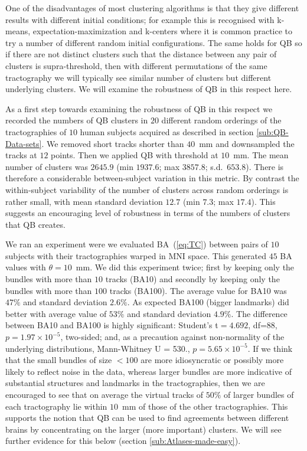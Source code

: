 \documentclass{bioinfo}
\begin{document}
One of the disadvantages of most clustering algorithms is that they give
different results with different initial conditions; for example this is
recognised with k-means, expectation-maximization
\citep{dempster1977maximum} and k-centers \citep{gonzalez1985clustering}
where it is common practice to try a number of different random initial
configurations. The same holds for QB so if there are not distinct
clusters such that the distance between any pair of clusters is
supra-threshold, then with different permutations of the same
tractography we will typically see similar number of clusters but
different underlying clusters. We will examine the robustness of QB in
this respect here.

As a first step towards examining the robustness of QB in this respect
we recorded the numbers of QB clusters in $20$ different random
orderings of the tractographies of $10$ human subjects acquired as
described in section \ref{sub:QB-Data-sets}. We removed short tracks
shorter than $40$~mm and downsampled the tracks at $12$ points. Then we
applied QB with threshold at $10$~mm. The mean number of clusters was
$2645.9$ (min $1937.6$; max $3857.8$; s.d.~$653.8$). There is therefore
a considerable between-subject variation in this metric. By contrast the
within-subject variability of the number of clusters across random
orderings is rather small, with mean standard deviation $12.7$ (min
$7.3$; max $17.4$). This suggests an encouraging level of robustness in
terms of the numbers of clusters that QB creates.

We ran an experiment were we evaluated BA~(\ref{eq:TC}) between pairs of
$10$ subjects with their tractographies warped in MNI space. This
generated $45$ BA values with $\theta=10$~mm. We did
this experiment twice; first by keeping only the bundles with more than
$10$ tracks (BA10) and secondly by keeping only the bundles with more
than $100$ tracks (BA100). The average value for BA10 was $47\%$ and
standard deviation $2.6\%$. As expected BA100 (bigger landmarks) did
better with average value of $53\%$ and standard deviation $4.9\%$. The
difference between BA10 and BA100 is highly significant: Student's
t$=4.692$, df=88, $p=1.97\times10^{-5}$, two-sided; and, as a precaution
against non-normality of the underlying distributions, Mann-Whitney U =
530., $p=5.65\times10^{-5}$. If we think that the small bundles of size
$<100$ are more idiosyncratic or possibly more likely to reflect noise
in the data, whereas larger bundles are more indicative of substantial
structures and landmarks in the tractographies, then we are encouraged
to see that on average the virtual tracks of $50\%$ of larger bundles of
each tractography lie within $10$~mm of those of the other
tractographies. This supports the notion that QB can be used to find
agreements between different brains by concentrating on the larger (more
important) clusters. We will see further evidence for this below
(section \ref{sub:Atlases-made-easy}).
\end{document}
